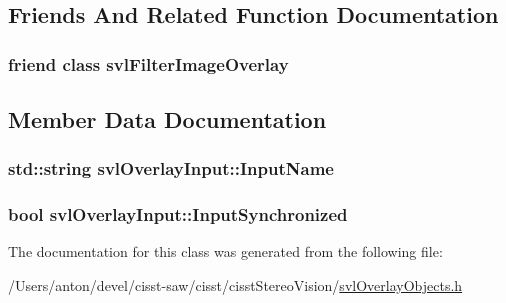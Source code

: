 \subsection{Friends And Related Function Documentation}
\hypertarget{classsvl_overlay_input_a83f118ae07b7352f907d08378ed1e2a8}{}
\subsubsection[{svl\+Filter\+Image\+Overlay}]{\setlength{\rightskip}{0pt plus 5cm}friend class {\bf svl\+Filter\+Image\+Overlay}\hspace{0.3cm}{\ttfamily [friend]}}\label{classsvl_overlay_input_a83f118ae07b7352f907d08378ed1e2a8}


\subsection{Member Data Documentation}
\hypertarget{classsvl_overlay_input_a193d910ca5ced17419e6c0bd51169265}{}
\subsubsection[{Input\+Name}]{\setlength{\rightskip}{0pt plus 5cm}std\+::string svl\+Overlay\+Input\+::\+Input\+Name\hspace{0.3cm}{\ttfamily [protected]}}\label{classsvl_overlay_input_a193d910ca5ced17419e6c0bd51169265}
\hypertarget{classsvl_overlay_input_a16cf008dbd4809ec1ccf0e9b28ac6d3a}{}
\subsubsection[{Input\+Synchronized}]{\setlength{\rightskip}{0pt plus 5cm}bool svl\+Overlay\+Input\+::\+Input\+Synchronized\hspace{0.3cm}{\ttfamily [protected]}}\label{classsvl_overlay_input_a16cf008dbd4809ec1ccf0e9b28ac6d3a}


The documentation for this class was generated from the following file\+:\begin{DoxyCompactItemize}
\item 
/\+Users/anton/devel/cisst-\/saw/cisst/cisst\+Stereo\+Vision/\hyperlink{svl_overlay_objects_8h}{svl\+Overlay\+Objects.\+h}\end{DoxyCompactItemize}
